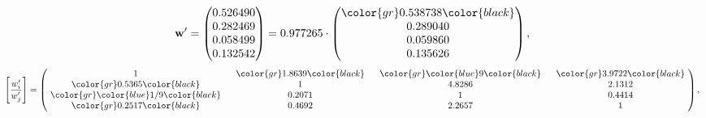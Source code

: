 \begin{example}
\begin{equation*}
\mathbf{w}^{\prime} =
\begin{pmatrix}
0.526490\\
0.282469\\
0.058499\\
0.132542
\end{pmatrix} =
0.977265\cdot
\begin{pmatrix}
\color{gr} 0.538738\color{black} \\
0.289040\\
0.059860\\
0.135626
\end{pmatrix},
\end{equation*}
\begin{equation*}
\left[ \frac{{w}^{\prime}_i}{{w}^{\prime}_j} \right] =
\begin{pmatrix}
$\,\,$ 1 $\,\,$ & $\,\,$\color{gr} 1.8639\color{black} $\,\,$ & $\,\,$\color{gr} \color{blue} 9\color{black} $\,\,$ & $\,\,$\color{gr} 3.9722\color{black} $\,\,$ \\
$\,\,$\color{gr} 0.5365\color{black} $\,\,$ & $\,\,$ 1 $\,\,$ & $\,\,$4.8286$\,\,$ & $\,\,$2.1312  $\,\,$ \\
$\,\,$\color{gr} \color{blue}  1/9\color{black} $\,\,$ & $\,\,$0.2071$\,\,$ & $\,\,$ 1 $\,\,$ & $\,\,$0.4414 $\,\,$ \\
$\,\,$\color{gr} 0.2517\color{black} $\,\,$ & $\,\,$0.4692$\,\,$ & $\,\,$2.2657$\,\,$ & $\,\,$ 1  $\,\,$ \\
\end{pmatrix},
\end{equation*}
\end{example}
\newpage
